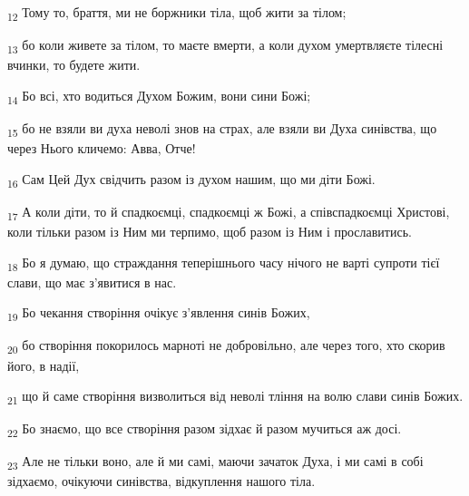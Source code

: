 \begin{tcolorbox}
\textsubscript{12} Тому то, браття, ми не боржники тіла, щоб жити за тілом;
\end{tcolorbox}
\begin{tcolorbox}
\textsubscript{13} бо коли живете за тілом, то маєте вмерти, а коли духом умертвляєте тілесні вчинки, то будете жити.
\end{tcolorbox}
\begin{tcolorbox}
\textsubscript{14} Бо всі, хто водиться Духом Божим, вони сини Божі;
\end{tcolorbox}
\begin{tcolorbox}
\textsubscript{15} бо не взяли ви духа неволі знов на страх, але взяли ви Духа синівства, що через Нього кличемо: Авва, Отче!
\end{tcolorbox}
\begin{tcolorbox}
\textsubscript{16} Сам Цей Дух свідчить разом із духом нашим, що ми діти Божі.
\end{tcolorbox}
\begin{tcolorbox}
\textsubscript{17} А коли діти, то й спадкоємці, спадкоємці ж Божі, а співспадкоємці Христові, коли тільки разом із Ним ми терпимо, щоб разом із Ним і прославитись.
\end{tcolorbox}
\begin{tcolorbox}
\textsubscript{18} Бо я думаю, що страждання теперішнього часу нічого не варті супроти тієї слави, що має з'явитися в нас.
\end{tcolorbox}
\begin{tcolorbox}
\textsubscript{19} Бо чекання створіння очікує з'явлення синів Божих,
\end{tcolorbox}
\begin{tcolorbox}
\textsubscript{20} бо створіння покорилось марноті не добровільно, але через того, хто скорив його, в надії,
\end{tcolorbox}
\begin{tcolorbox}
\textsubscript{21} що й саме створіння визволиться від неволі тління на волю слави синів Божих.
\end{tcolorbox}
\begin{tcolorbox}
\textsubscript{22} Бо знаємо, що все створіння разом зідхає й разом мучиться аж досі.
\end{tcolorbox}
\begin{tcolorbox}
\textsubscript{23} Але не тільки воно, але й ми самі, маючи зачаток Духа, і ми самі в собі зідхаємо, очікуючи синівства, відкуплення нашого тіла.
\end{tcolorbox}
